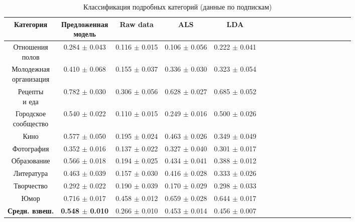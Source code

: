 \documentclass[times,specification,annotation]{itmo-student-thesis}
\begin{document}
\begin{table}[!h]
\caption{Классификация подробных категорий (данные по подпискам)}\label{tab-subs-d}
\centering
\begin{tabular}{|*{18}{c|}}\hline
Категория & \thead{Предложенная \\  модель}  & Raw data & ALS & LDA  \\\hline
\thead{Отношения  \\ полов}                   
											 & 0.284 $\pm$ 0.043 & 0.116 $\pm$ 0.015 & 0.106 $\pm$ 0.056 & 0.222 $\pm$ 0.041 \\\hline
\thead{Молодежная \\ организация}   
											 & 0.410 $\pm$ 0.068 & 0.155 $\pm$ 0.037 & 0.336 $\pm$ 0.030 & 0.323 $\pm$ 0.054  \\\hline
\thead{Рецепты \\ и еда}        
											 & 0.782 $\pm$ 0.030 & 0.306 $\pm$ 0.056 & 0.628 $\pm$ 0.027 & 0.685 $\pm$ 0.052 \\\hline
\thead{Городское \\ сообщество}                        
											 & 0.540 $\pm$ 0.022 & 0.110 $\pm$ 0.015 & 0.249 $\pm$ 0.016 & 0.500 $\pm$ 0.026 \\\hline
Кино                      				 & 0.577 $\pm$ 0.050 & 0.195 $\pm$ 0.024 & 0.463 $\pm$ 0.026 & 0.349 $\pm$ 0.049 \\\hline
Фотография                      & 0.352 $\pm$ 0.016 & 0.137 $\pm$ 0.022 & 0.327 $\pm$ 0.040 & 0.301 $\pm$ 0.017 \\\hline
Образование                     & 0.566 $\pm$ 0.018 & 0.194 $\pm$ 0.025 & 0.434 $\pm$ 0.041 & 0.388 $\pm$ 0.012 \\\hline
Литература                       & 0.463 $\pm$ 0.039 & 0.157 $\pm$ 0.030 & 0.416 $\pm$ 0.028 & 0.333 $\pm$ 0.026 \\\hline
Творчество                        & 0.292 $\pm$ 0.022 & 0.190 $\pm$ 0.039 & 0.170 $\pm$ 0.029 & 0.298 $\pm$ 0.033 \\\hline
Юмор                                  & 0.716 $\pm$ 0.017 & 0.458 $\pm$ 0.012 & 0.659 $\pm$ 0.028 & 0.644 $\pm$ 0.017 \\\hline
\textbf{Средн. взвеш.} & \textbf{0.548 $\pm$ 0.010} & 0.266 $\pm$ 0.010 & 0.453 $\pm$ 0.014 & 0.456 $\pm$ 0.007 \\\hline
\end{tabular}
\end{table}

\end{document}
